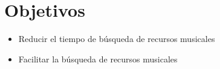 
\section*{Objetivos}

\begin{itemize}
	\item Reducir el tiempo de búsqueda de recursos musicales
	\item Facilitar la búsqueda de recursos musicales
\end{itemize}





